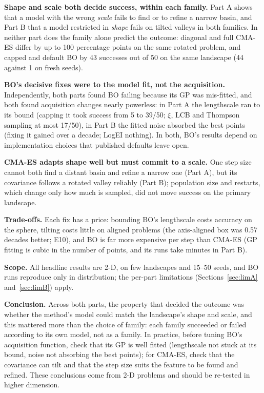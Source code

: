 \documentclass[10pt,a4paper]{article}
\makeatletter
\renewcommand\section{\@startsection{section}{1}{\z@}{-2.5ex \@plus -.5ex \@minus -.2ex}{1.2ex \@plus.2ex}{\normalfont\large\bfseries}}
\makeatother
\begin{document}
\section{Synthesis and conclusion}\label{sec:synth}
\textbf{Shape and scale both decide success, within each family.} Part A shows that a model with the wrong
\emph{scale} fails to find or to refine a narrow basin, and Part B that a model restricted in \emph{shape} fails on
tilted valleys in both families. In neither part does the family alone predict the outcome: diagonal and full
CMA-ES differ by up to 100 percentage points on the same rotated problem, and capped and default BO by 43 successes
out of 50 on the same landscape (44 against 1 on fresh seeds).

\textbf{BO's decisive fixes were to the model fit, not the acquisition.} Independently, both parts found BO
failing because its GP was mis-fitted, and both found acquisition changes nearly powerless: in Part A the lengthscale
ran to its bound (capping it took success from 5 to 39/50; $\xi$, LCB and Thompson sampling at most 17/50), in Part B
the fitted noise absorbed the best points (fixing it gained over a decade; LogEI nothing). In both, BO's results
depend on implementation choices that published defaults leave open.

\textbf{CMA-ES adapts shape well but must commit to a scale.} One step size cannot both find a distant basin and
refine a narrow one (Part A), but its covariance follows a rotated valley reliably (Part B); population size and
restarts, which change only how much is sampled, did not move success on the primary landscape.

\textbf{Trade-offs.} Each fix has a price: bounding BO's lengthscale costs accuracy on the sphere, tilting costs
little on aligned problems (the axis-aligned box was 0.57 decades better; E10), and BO is far more expensive per
step than CMA-ES (GP fitting is cubic in the number of points, and its runs take minutes in Part B).

\textbf{Scope.} All headline results are 2-D, on few landscapes and 15--50 seeds, and BO runs reproduce only in
distribution; the per-part limitations (Sections~\ref{sec:limA} and~\ref{sec:limB}) apply.

\textbf{Conclusion.} Across both parts, the property that decided the outcome was whether the method's model could
match the landscape's shape and scale, and this mattered more than the choice of family: each family succeeded or
failed according to its own model, not as a family. In practice, before tuning BO's acquisition function, check that
its GP is well fitted (lengthscale not stuck at its bound, noise not absorbing the best points); for CMA-ES, check
that the covariance can tilt and that the step size suits the feature to be found and refined. These conclusions
come from 2-D problems and should be re-tested in higher dimension.

\small


\end{document}
